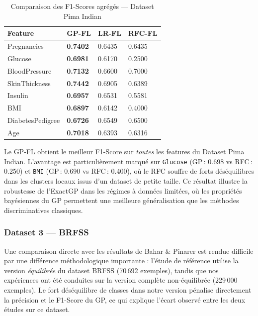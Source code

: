 \documentclass[12pt,a4paper]{article}
\begin{document}
\begin{table}[H]
\centering
\caption{Comparaison des F1-Scores agrégés — Dataset Pima Indian}
\label{tab:comparison_pima}
\small
\begin{tabular}{p{3.5cm}p{2.5cm}p{2.5cm}p{2.5cm}}
\hline
\textbf{Feature} & \textbf{GP-FL} & \textbf{LR-FL} & \textbf{RFC-FL} \\
\hline
Pregnancies       & \textbf{0.7402} & 0.6435 & 0.6435 \\
Glucose           & \textbf{0.6981} & 0.6170 & 0.2500 \\
BloodPressure     & \textbf{0.7132} & 0.6600 & 0.7000 \\
SkinThickness     & \textbf{0.7442} & 0.6905 & 0.6389 \\
Insulin           & \textbf{0.6957} & 0.6531 & 0.5581 \\
BMI               & \textbf{0.6897} & 0.6142 & 0.4000 \\
DiabetesPedigree  & \textbf{0.6726} & 0.6549 & 0.6500 \\
Age               & \textbf{0.7018} & 0.6393 & 0.6316 \\
\hline
\end{tabular}
\end{table}

Le GP-FL obtient le meilleur F1-Score sur \textit{toutes} les features du Dataset Pima Indian. L'avantage est particulièrement marqué sur \texttt{Glucose} (GP\,: 0.698 vs RFC\,: 0.250) et \texttt{BMI} (GP\,: 0.690 vs RFC\,: 0.400), où le RFC souffre de forts déséquilibres dans les clusters locaux issus d'un dataset de petite taille. Ce résultat illustre la robustesse de l'ExactGP dans les régimes à données limitées, où les propriétés bayésiennes du GP permettent une meilleure généralisation que les méthodes discriminatives classiques.

\subsubsection*{Dataset 3 — BRFSS}

Une comparaison directe avec les résultats de Bahar \& Pinarer est rendue difficile par une différence méthodologique importante : l'étude de référence utilise la version \textit{équilibrée} du dataset BRFSS (70\,692 exemples), tandis que nos expériences ont été conduites sur la version complète non-équilibrée (229\,000 exemples). Le fort déséquilibre de classes dans notre version pénalise directement la précision et le F1-Score du GP, ce qui explique l'écart observé entre les deux études sur ce dataset.
\end{document}
